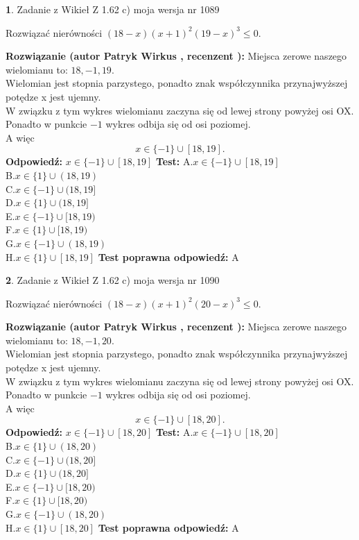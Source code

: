 \documentclass[12pt, a4paper]{article}
\theoremstyle{definition} %
\newtheorem{zad}{}
\newcommand{\zadStart}[1]{\begin{zad}#1\newline}
\newcommand{\zadStop}{\end{zad}}
\newcommand{\rozwStart}[2]{\noindent \textbf{Rozwiązanie (autor #1 , recenzent #2): }\newline}
\newcommand{\rozwStop}{\newline}
\newcommand{\odpStart}{\noindent \textbf{Odpowiedź:}\newline}
\newcommand{\odpStop}{\newline}
\newcommand{\testStart}{\noindent \textbf{Test:}\newline}
\newcommand{\testStop}{\newline}
\newcommand{\kluczStart}{\noindent \textbf{Test poprawna odpowiedź:}\newline}
\newcommand{\kluczStop}{\newline}
\begin{document}
\zadStart{Zadanie z Wikieł Z 1.62 c) moja wersja nr 1089}

Rozwiązać nierówności $(18-x)(x+1)^{2}(19-x)^{3}\le0$.
\zadStop
\rozwStart{Patryk Wirkus}{}
Miejsca zerowe naszego wielomianu to: $18, -1, 19$.\\
Wielomian jest stopnia parzystego, ponadto znak współczynnika przy\linebreak najwyższej potędze x jest ujemny.\\ W związku z tym wykres wielomianu zaczyna się od lewej strony powyżej osi OX.\\
Ponadto w punkcie $-1$ wykres odbija się od osi poziomej.\\
A więc $$x \in \{-1\} \cup [18,19].$$
\rozwStop
\odpStart
$x \in \{-1\} \cup [18,19]$
\odpStop
\testStart
A.$x \in \{-1\} \cup [18,19]$\\
B.$x \in \{1\} \cup (18,19)$\\
C.$x \in \{-1\} \cup (18,19]$\\
D.$x \in \{1\} \cup (18,19]$\\
E.$x \in \{-1\} \cup [18,19)$\\
F.$x \in \{1\} \cup [18,19)$\\
G.$x \in \{-1\} \cup (18,19)$\\
H.$x \in \{1\} \cup [18,19]$
\testStop
\kluczStart
A
\kluczStop



\zadStart{Zadanie z Wikieł Z 1.62 c) moja wersja nr 1090}

Rozwiązać nierówności $(18-x)(x+1)^{2}(20-x)^{3}\le0$.
\zadStop
\rozwStart{Patryk Wirkus}{}
Miejsca zerowe naszego wielomianu to: $18, -1, 20$.\\
Wielomian jest stopnia parzystego, ponadto znak współczynnika przy\linebreak najwyższej potędze x jest ujemny.\\ W związku z tym wykres wielomianu zaczyna się od lewej strony powyżej osi OX.\\
Ponadto w punkcie $-1$ wykres odbija się od osi poziomej.\\
A więc $$x \in \{-1\} \cup [18,20].$$
\rozwStop
\odpStart
$x \in \{-1\} \cup [18,20]$
\odpStop
\testStart
A.$x \in \{-1\} \cup [18,20]$\\
B.$x \in \{1\} \cup (18,20)$\\
C.$x \in \{-1\} \cup (18,20]$\\
D.$x \in \{1\} \cup (18,20]$\\
E.$x \in \{-1\} \cup [18,20)$\\
F.$x \in \{1\} \cup [18,20)$\\
G.$x \in \{-1\} \cup (18,20)$\\
H.$x \in \{1\} \cup [18,20]$
\testStop
\kluczStart
A
\kluczStop
\end{document}
